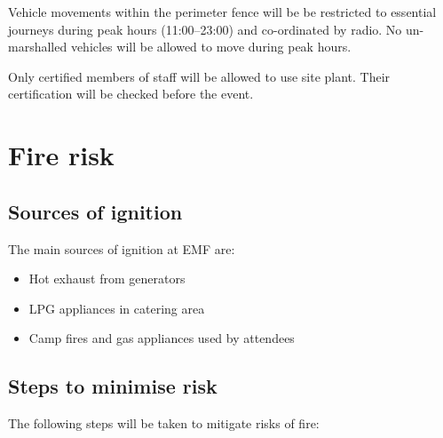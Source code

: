 Vehicle movements within the perimeter fence will be be restricted to essential journeys during peak hours (11:00--23:00) and co-ordinated by radio. No un-marshalled vehicles will be allowed to move during peak hours.

Only certified members of staff will be allowed to use site plant. Their certification will be checked before the event.

\section{Fire risk}
\subsection{Sources of ignition}

The main sources of ignition at EMF are:

\begin{itemize}
\item Hot exhaust from generators
\item LPG appliances in catering area
\item Camp fires and gas appliances used by attendees
\end{itemize}

\subsection{Steps to minimise risk}
The following steps will be taken to mitigate risks of fire:

